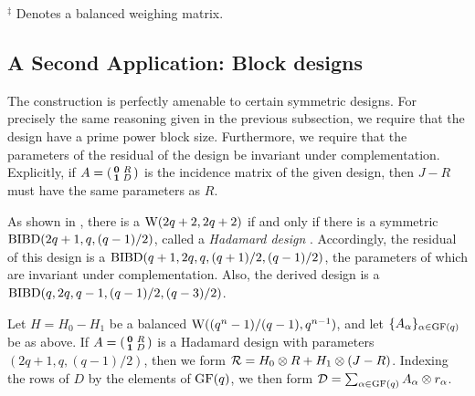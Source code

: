 \documentclass[../../../main]{subfiles}
\begin{document}
$^\ddag$ Denotes a balanced weighing matrix.

\dinkus

\subsection{A Second Application: Block designs}

The construction is perfectly amenable to certain symmetric designs. For precisely the same reasoning given in the previous subsection, we require that the design have a prime power block size. Furthermore, we require that the parameters of the residual of the design be invariant under complementation. Explicitly, if $A = \left(\begin{smallmatrix} \mathbf{0} & R \\ \mathbf{1} & D \end{smallmatrix}\right)$ is the incidence matrix of the given design, then $J-R$ must have the same parameters as $R$.

As shown in \cite{combinatorial-theory}, there is a $\text{W}(2q+2,2q+2)$ if and only if there is a symmetric $\text{BIBD}(2q+1,q,(q-1)/2)$, called a {\it Hadamard design} . Accordingly, the residual of this design is a $\text{BIBD}(q+1,2q,q,(q+1)/2,(q-1)/2)$, the parameters of which are invariant under complementation. Also, the derived design is a $\text{BIBD}(q,2q,q-1,(q-1)/2,(q-3)/2)$.

Let $H=H_0-H_1$ be a balanced $\text{W}((q^n-1)/(q-1),q^{n-1})$, and let $\{A_\alpha\}_{\alpha\in\text{GF}(q)}$ be as above. If $A = \left(\begin{smallmatrix} \mathbf{0} & R \\ \mathbf{1} & D \end{smallmatrix}\right)$ is a Hadamard design with parameters $(2q+1,q,(q-1)/2)$, then we form $\mathcal{R} = H_0 \otimes R + H_1 \otimes (J-R)$. Indexing the rows of $D$ by the elements of $\text{GF}(q)$, we then form $\mathcal{D} = \sum_{\alpha\in\text{GF}(q)} A_\alpha \otimes r_\alpha$.
\end{document}
